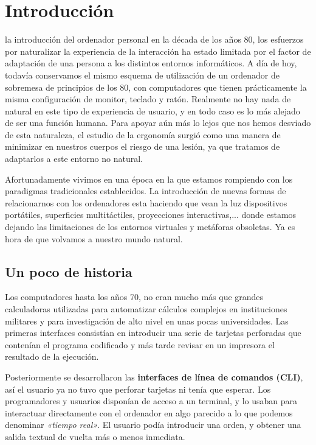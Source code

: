 \chapter{Introducción}
 la introducción del ordenador personal en la década de los años 80, los esfuerzos por naturalizar la experiencia de la interacción ha estado limitada por el factor de adaptación de una persona a los distintos entornos informáticos. A día de hoy, todavía conservamos el mismo esquema de utilización de un ordenador de sobremesa de principios de los 80, con computadores que tienen prácticamente la misma configuración de monitor, teclado y ratón. Realmente no hay nada de natural en este tipo de experiencia de usuario, y en todo caso es lo más alejado de ser una función humana. Para apoyar aún más lo lejos que nos hemos desviado de esta naturaleza, el estudio de la ergonomía surgió como una manera de minimizar en nuestros cuerpos el riesgo de una lesión, ya que tratamos de adaptarlos a este entorno no natural.

Afortunadamente vivimos en una época en la que estamos rompiendo con los paradigmas tradicionales establecidos. La introducción de nuevas formas de relacionarnos con los ordenadores esta haciendo que vean la luz dispositivos portátiles, superficies multitáctiles, proyecciones interactivas,... donde estamos dejando las limitaciones de los entornos virtuales y metáforas obsoletas. Ya es hora de que volvamos a nuestro mundo natural.

\section{Un poco de historia}
Los computadores hasta los años 70, no eran mucho más que grandes calculadoras utilizadas para automatizar cálculos complejos en instituciones militares y para investigación de alto nivel en unas pocas universidades. Las primeras interfaces consistían en introducir una serie de tarjetas perforadas que contenían el programa codificado y más tarde revisar en un impresora el resultado de la ejecución.

Posteriormente se desarrollaron las \textbf{interfaces de línea de comandos (\acs{CLI})}, así el usuario ya no tuvo que perforar tarjetas ni tenía que esperar. Los programadores y usuarios disponían de acceso a un terminal, y lo usaban para interactuar directamente con el ordenador en algo parecido a lo que podemos denominar \textit{«tiempo real»}. El usuario podía introducir una orden, y obtener una salida textual de vuelta más o menos inmediata.

